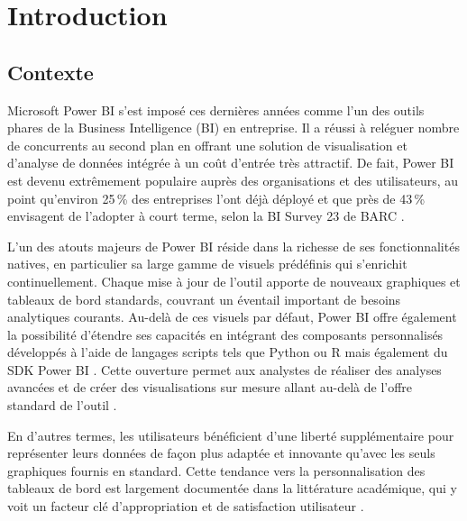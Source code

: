 \chapter{Introduction}

\section{Contexte}

Microsoft Power BI s’est imposé ces dernières années comme l’un des outils phares de la Business Intelligence (BI) en entreprise. Il a réussi à reléguer nombre de concurrents au second plan en offrant une solution de visualisation et d’analyse de données intégrée à un coût d’entrée très attractif. De fait, Power BI est devenu extrêmement populaire auprès des organisations et des utilisateurs, au point qu’environ 25\,\% des entreprises l’ont déjà déployé et que près de 43\,\% envisagent de l’adopter à court terme, selon la BI Survey 23 de BARC \parencite{Tirupati2023}.

L’un des atouts majeurs de Power BI réside dans la richesse de ses fonctionnalités natives, en particulier sa large gamme de visuels prédéfinis qui s’enrichit continuellement. Chaque mise à jour de l’outil apporte de nouveaux graphiques et tableaux de bord standards, couvrant un éventail important de besoins analytiques courants. Au-delà de ces visuels par défaut, Power BI offre également la possibilité d’étendre ses capacités en intégrant des composants personnalisés développés à l’aide de langages scripts tels que Python ou R mais également du SDK Power BI . Cette ouverture permet aux analystes de réaliser des analyses avancées et de créer des visualisations sur mesure allant au-delà de l’offre standard de l’outil \parencite{Dossier2024}.  

En d’autres termes, les utilisateurs bénéficient d’une liberté supplémentaire pour représenter leurs données de façon plus adaptée et innovante qu’avec les seuls graphiques fournis en standard. Cette tendance vers la personnalisation des tableaux de bord est largement documentée dans la littérature académique, qui y voit un facteur clé d’appropriation et de satisfaction utilisateur \parencite{Amyrotos2024}.  


